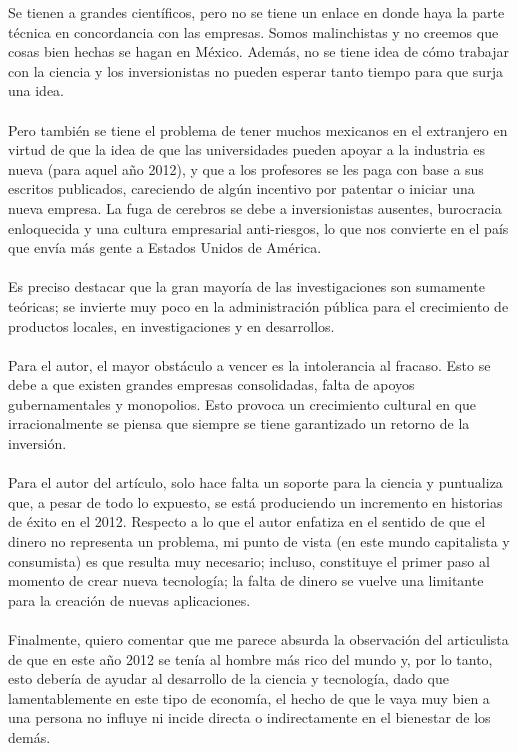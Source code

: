 \documentclass[letterpaper,12pt]{article} %
\begin{document}
	\hfill \break
	Se tienen a grandes científicos, pero no se tiene un enlace en donde haya la parte técnica en concordancia con las empresas. Somos malinchistas  y no creemos que cosas bien hechas se hagan en México. Además, no se tiene idea de cómo trabajar con la ciencia y los inversionistas no pueden esperar tanto tiempo para que surja una idea. \\ \\
	Pero también se tiene el problema de tener muchos mexicanos en el extranjero en virtud de que la idea de que las universidades pueden apoyar a la industria es nueva (para aquel año 2012), y que a los profesores se les paga con base a sus escritos publicados, careciendo de algún incentivo por patentar o iniciar una nueva empresa. La fuga de cerebros se debe a inversionistas ausentes, burocracia enloquecida y una cultura empresarial anti-riesgos, lo que nos convierte en el país que envía más gente a Estados Unidos de América. \\ \\
	Es preciso destacar que la gran mayoría de las investigaciones son sumamente teóricas; se invierte muy poco en la administración pública para el crecimiento de productos locales, en investigaciones y en desarrollos. \\ \\
	Para el autor, el mayor obstáculo a vencer es la intolerancia al fracaso. Esto se debe a que existen grandes empresas consolidadas, falta de apoyos gubernamentales y monopolios. Esto provoca un crecimiento cultural en que irracionalmente se piensa que siempre se tiene garantizado un retorno de la inversión. \\ \\
	Para el autor del artículo, solo hace falta un soporte para la ciencia y puntualiza que, a pesar de todo lo expuesto, se está produciendo un incremento en historias de éxito en el 2012. Respecto a lo que el autor enfatiza en el sentido de que el dinero no representa un problema, mi punto de vista (en este mundo capitalista y consumista) es que resulta muy necesario; incluso, constituye el primer paso al momento de crear nueva tecnología; la falta de dinero se vuelve una limitante para la creación de nuevas aplicaciones. \\ \\
	Finalmente, quiero comentar que me parece absurda la observación del articulista de que en este año 2012 se tenía al hombre más rico del mundo y, por lo tanto, esto debería de ayudar al desarrollo de la ciencia y tecnología, dado que lamentablemente en este tipo de economía, el hecho de que le vaya muy bien a una persona no influye ni incide directa o indirectamente en el bienestar de los demás.	
\end{document}
